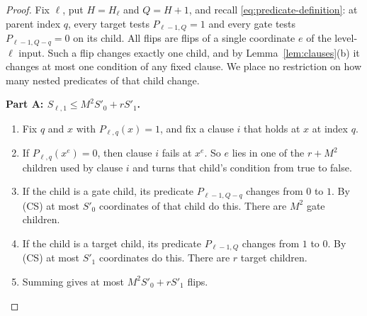 \documentclass[11pt]{article}
\theoremstyle{definition}
\theoremstyle{remark}
\begin{document}
\begin{proof}
Fix $\ell$, put $H=H_\ell$ and $Q=H+1$, and recall
\eqref{eq:predicate-definition}: at parent index $q$, every
target tests $P_{\ell-1,Q}=1$ and every gate tests
$P_{\ell-1,Q-q}=0$ on its child.
All flips are flips of a single coordinate \(e\) of the level-\(\ell\) input. Such a flip changes exactly one child, and by Lemma~\ref{lem:clauses}(b) it changes at most one condition of any fixed clause.
We place no restriction on how many nested predicates of that child change.

\medskip\noindent\textbf{Part A: \(S_{\ell,1}\le M^2S'_0+rS'_1\).}
\begin{enumerate}[label=\textbf{A\arabic*.},leftmargin=*]
\item Fix \(q\) and \(x\) with \(P_{\ell,q}(x)=1\), and fix a clause \(i\) that holds at \(x\) at index \(q\).
\item If \(P_{\ell,q}(x^e)=0\), then clause \(i\) fails at \(x^e\). So \(e\) lies in one of the \(r+M^2\) children used by clause \(i\) and turns that child's condition from true to false.
\item If the child is a gate child, its predicate \(P_{\ell-1,Q-q}\) changes from \(0\) to \(1\). By (CS) at most \(S'_0\) coordinates of that child do this. There are \(M^2\) gate children.
\item If the child is a target child, its predicate \(P_{\ell-1,Q}\) changes from \(1\) to \(0\). By (CS) at most \(S'_1\) coordinates do this. There are \(r\) target children.
\item Summing gives at most \(M^2S'_0+rS'_1\) flips.
\end{enumerate}


\end{proof}
\end{document}
